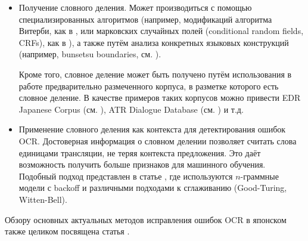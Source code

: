 \begin{itemize}
	\item Получение словного деления. Может производиться с помощью специализированных алгоритмов (например, модификаций алгоритма Витерби, как в \cite{nagata:context}, или марковских случайных полей (conditional random fields, CRFs), как в \cite{kudo:crfs}), а также путём анализа конкретных языковых конструкций (например, bunsetsu boundaries, см. \cite{chung:bunsetsu}).
	
	Кроме того, словное деление может быть получено путём использования в работе предварительно размеченного корпуса, в разметке которого есть словное деление. В качестве примеров таких корпусов можно привести EDR Japanese Corpus (см. \cite{corpus:edr}), ATR Dialogue Database (см. \cite{corpus:atr}) и т.д.
	
	\item Применение словного деления как контекста для детектирования ошибок OCR. Достоверная информация о словном делении позволяет считать слова единицами трансляции, не теряя контекста предложения. Это даёт возможность получить больше признаков для машинного обучения. Подобный подход представлен в статье \cite{nagata:shape}, где используются $n$-граммные модели с backoff и различными подходами к сглаживанию (Good-Turing, Witten-Bell). 
\end{itemize}

Обзору основных актуальных методов исправления ошибок OCR в японском также целиком посвящена статья \cite{das:survey}.
